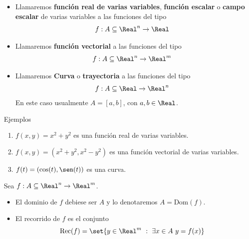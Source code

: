 \begin{frame}
\vspace{-0.5cm}
\begin{defn}
  \begin{itemize}[<+->]
    \item Llamaremos \textbf{función real de varias variables}, \textbf{función escalar} o \textbf{campo escalar} de varias variables a las funciones del tipo 
    $$f:A\subseteq\Real^n\to\Real$$
    \item Llamaremos \textbf{función vectorial} a las funciones del tipo 
    $$f:A\subseteq\Real^n\to\Real^m$$
    \item Llamaremos \textbf{Curva} o \textbf{trayectoria} a las funciones del tipo
    $$f:A\subseteq\Real\to\Real^n$$
    En este caso usualmente $A=[a,b]$, con $a,b\in\Real$.
  \end{itemize}
\end{defn}
\vspace{-0.25cm}
\end{frame}

\begin{frame}{Ejemplos}
\begin{enumerate}
  \item $f(x,y)=x^2+y^2$ es una función real de varias variables.
  \item $f(x,y)=(x^2+y^2,x^2-y^2)$ es una función vectorial de varias variables.
  \item $f(t)=(\cos(t),\sen(t))$ es una curva.
\end{enumerate}
\end{frame}

\begin{frame}
  \begin{defn}
    Sea $f:A\subseteq\Real^n\to\Real^m$.
    \begin{itemize}[<+->]
      \item El dominio de $f$ debiese ser $A$ y lo denotaremos $A=\text{Dom}(f)$.\\[0.25cm]
      \item El recorrido de $f$ es el conjunto
      $$\text{Rec}(f)=\set{y\in\Real^m\ :\ \exists x\in A\ y=f(x)}$$
    \end{itemize}
  \end{defn}
\end{frame}


